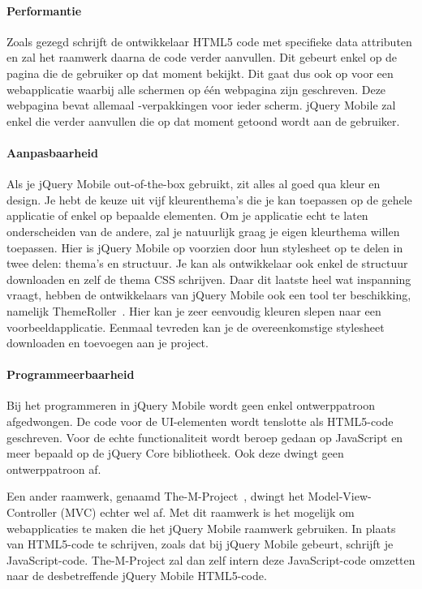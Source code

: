 \paragraph{Performantie}
Zoals gezegd schrijft de ontwikkelaar HTML5 code met specifieke data attributen en zal het raamwerk daarna de code verder aanvullen. Dit gebeurt enkel op de pagina die de gebruiker op dat moment bekijkt. Dit gaat dus ook op voor een webapplicatie waarbij alle schermen op één webpagina zijn geschreven. Deze webpagina bevat allemaal -verpakkingen voor ieder scherm. jQuery Mobile zal enkel die  verder aanvullen die op dat moment getoond wordt aan de gebruiker. 

\paragraph{Aanpasbaarheid}
Als je jQuery Mobile out-of-the-box gebruikt, zit alles al goed qua kleur en design. Je hebt de keuze uit vijf kleurenthema's die je kan toepassen op de gehele applicatie of enkel op bepaalde elementen. Om je applicatie echt te laten onderscheiden van de andere, zal je natuurlijk graag je eigen kleurthema willen toepassen. Hier is jQuery Mobile op voorzien door hun stylesheet op te delen in twee delen: thema's en structuur. Je kan als ontwikkelaar ook enkel de structuur downloaden en zelf de thema CSS schrijven. Daar dit laatste heel wat inspanning vraagt, hebben de ontwikkelaars van jQuery Mobile ook een tool ter beschikking,  namelijk ThemeRoller~\cite{JQuery2012c}. Hier kan je zeer eenvoudig kleuren slepen naar een voorbeeldapplicatie. Eenmaal tevreden kan je de overeenkomstige stylesheet downloaden en toevoegen aan je project.

\paragraph{Programmeerbaarheid}
Bij het programmeren in jQuery Mobile wordt geen enkel ontwerppatroon afgedwongen. De code voor de UI-elementen wordt tenslotte als HTML5-code geschreven. Voor de echte functionaliteit wordt beroep gedaan op JavaScript en meer bepaald op de jQuery Core bibliotheek. Ook deze dwingt geen ontwerppatroon af.

Een ander raamwerk, genaamd The-M-Project~\cite{Panacoda2012}, dwingt het Model-View-Controller (MVC) echter wel af. Met dit raamwerk is het mogelijk om webapplicaties te maken die het jQuery Mobile raamwerk gebruiken. In plaats van HTML5-code te schrijven, zoals dat bij jQuery Mobile gebeurt, schrijft je JavaScript-code. The-M-Project zal dan zelf intern deze JavaScript-code omzetten naar de desbetreffende jQuery Mobile HTML5-code.

